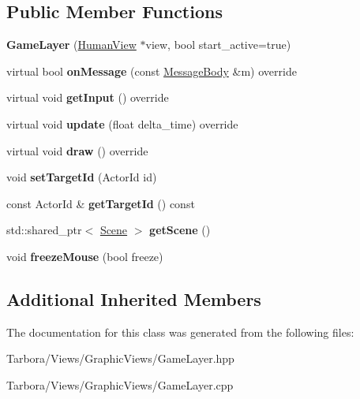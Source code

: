 \subsection*{Public Member Functions}
\begin{DoxyCompactItemize}
\item 
\mbox{\label{classTarbora_1_1GameLayer_a9a624aa27bf638bab890e78e5604f44c}} 
{\bfseries Game\+Layer} (\hyperlink{classTarbora_1_1HumanView}{Human\+View} $\ast$view, bool start\+\_\+active=true)
\item 
\mbox{\label{classTarbora_1_1GameLayer_a1d70196a70ef9c1cc7acf7c5b908be02}} 
virtual bool {\bfseries on\+Message} (const \hyperlink{classTarbora_1_1MessageBody}{Message\+Body} \&m) override
\item 
\mbox{\label{classTarbora_1_1GameLayer_ad3a39e9730ea40ebee92a43e42e1a249}} 
virtual void {\bfseries get\+Input} () override
\item 
\mbox{\label{classTarbora_1_1GameLayer_a20514f1a57bf8a3e3d4a74067d6f24dd}} 
virtual void {\bfseries update} (float delta\+\_\+time) override
\item 
\mbox{\label{classTarbora_1_1GameLayer_ab4b1aabaca2dde69cdba47ff98657b69}} 
virtual void {\bfseries draw} () override
\item 
\mbox{\label{classTarbora_1_1GameLayer_afc05735a53b9213a41a317195b938848}} 
void {\bfseries set\+Target\+Id} (Actor\+Id id)
\item 
\mbox{\label{classTarbora_1_1GameLayer_a4feb03466ed79adb482bc759e4106cef}} 
const Actor\+Id \& {\bfseries get\+Target\+Id} () const
\item 
\mbox{\label{classTarbora_1_1GameLayer_aa95596d17f70cdfa47dffcbc83366faf}} 
std\+::shared\+\_\+ptr$<$ \hyperlink{classTarbora_1_1Scene}{Scene} $>$ {\bfseries get\+Scene} ()
\item 
\mbox{\label{classTarbora_1_1GameLayer_ac447161777b7e86d435eaca87651cde3}} 
void {\bfseries freeze\+Mouse} (bool freeze)
\end{DoxyCompactItemize}
\subsection*{Additional Inherited Members}


The documentation for this class was generated from the following files\+:\begin{DoxyCompactItemize}
\item 
Tarbora/\+Views/\+Graphic\+Views/Game\+Layer.\+hpp\item 
Tarbora/\+Views/\+Graphic\+Views/Game\+Layer.\+cpp\end{DoxyCompactItemize}
